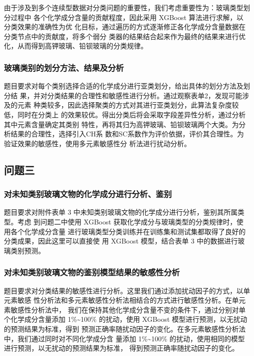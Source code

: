 \documentclass[withoutpreface,bwprint]{cumcmthesis} %
\begin{document}
由于涉及到多个连续型数据对分类问题的重要性，我们考虑重要性为：玻璃类型划分过程中
各个化学成分含量的贡献程度，因此采用 XGBoost 算法进行求解，以分类效果的准确性为优
化目标，通过遍历的方式逐渐修正各化学成分含量数据在分类节点中的贡献度，将多个弱分
类器的结果结合起来作为最终的结果来进行优化，从而得到高钾玻璃、铅钡玻璃的分类规律。

\subsubsection{玻璃类别的划分方法、结果及分析}%
题目要求对每个类别选择合适的化学成分进行亚类划分，给出具体的划分方法及划分结
果，并对分类结果的合理性和敏感性进行分析。通过观察表单2，发现可能涉及的元素
种类较多，因此选择聚类的方式对其进行亚类划分，此算法复杂度较低，同时在分类上
的效果较优。得出分类后将会采取字段差异性分析，通过分析其中元素含量确定其类别
特性，再将其归为高钾玻璃、铅钡玻璃两个大类。为分析结果的合理性，选择引入CH系
数和SC系数作为评价依据，评价其合理性。为验证效果的敏感性，使用多元素敏感性分
析法进行扰动分析。

\subsection{问题三}
\subsubsection{对未知类别玻璃文物的化学成分进行分析、鉴别}%
题目要求对附件表单 3 中未知类别玻璃文物的化学成分进行分析，鉴别其所属类型。考虑
到问题二中使用 XGBoost 获取化学成分与玻璃类型的分类规律时，使用各个化学成分含量
进行玻璃类型分类训练并在训练集和测试集都取得了良好的分类成果，因此这里可以直接使
用 XGBoost 模型，结合表单 3 中的数据进行玻璃类别预测。

\subsubsection{对未知类别玻璃文物的鉴别模型结果的敏感性分析}%
题目要求对分类结果的敏感性进行分析。这里我们通过添加扰动因子的方式，以单元素敏感
性分析法和多元素敏感性分析法相结合的方式进行敏感性分析。在单元素敏感性分析法中，
我们在保持其他化学成分含量不变的条件下，通过分别对单个化学成分含量添加
1\%\~{}100\% 的扰动，使用 XGBoost 模型进行预测，以无扰动的预测结果为标准，得到
预测正确率随扰动因子的变化。在多元素敏感性分析法中，我们通过同时对不同化学成分含
量添加 1\%\~{}100\% 的扰动，使用相同的模型进行预测，以无扰动的预测结果为标准，
得到预测正确率随扰动因子的变化。
\end{document}
